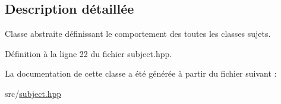 \subsection{Description détaillée}
Classe abstraite définissant le comportement des toutes les classes sujets. 

Définition à la ligne 22 du fichier subject.\+hpp.



La documentation de cette classe a été générée à partir du fichier suivant \+:\begin{DoxyCompactItemize}
\item 
src/\hyperlink{subject_8hpp}{subject.\+hpp}\end{DoxyCompactItemize}
